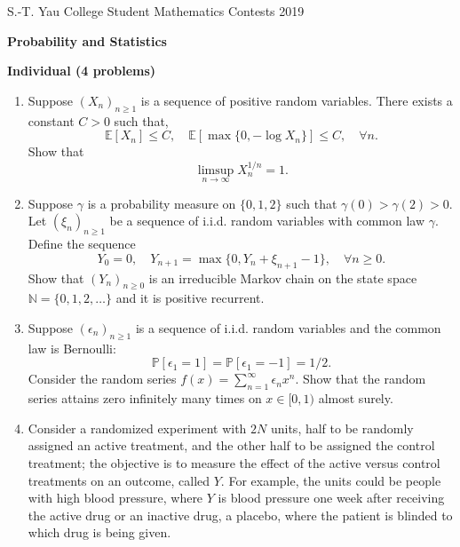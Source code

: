 \documentclass[10pt]{article}
\begin{document}
\begin{center}
S.-T. Yau College Student Mathematics Contests 2019

\vspace{0.1cm}

\Large {\bf Probability and Statistics}

\vspace{0.1cm}

\large {\bf Individual (4 problems)}

\vspace{0.1cm}

\end{center}


\begin{enumerate}

\item[1)]
Suppose $(X_n)_{n\ge 1}$ is a sequence of positive random variables. There exists a constant $C>0$ such that,
\[\mathbb{E}[X_n]\le C, \quad \mathbb{E}[\max\{0, -\log X_n\}]\le C, \quad \forall n. \]
Show that \[\limsup_{n\to\infty}X_n^{1/n}=1.\]

\item[2)]
Suppose $\gamma$ is a probability measure on $\{0,1,2\}$ such that $\gamma(0)>\gamma(2)>0$. Let $(\xi_n)_{n\ge 1}$ be a sequence of i.i.d. random variables with common law $\gamma$. Define the sequence
\[Y_0=0,\quad Y_{n+1}=\max\{0, Y_n+\xi_{n+1}-1\},\quad \forall n\ge 0.\]
Show that $(Y_n)_{n\ge 0}$ is an irreducible Markov chain on the state space $\mathbb{N}=\{0, 1, 2, \ldots\}$ and it is positive recurrent.

\item[3)]
Suppose $(\epsilon_n)_{n\ge 1}$ is a sequence of i.i.d. random variables and the common law is Bernoulli: \[\mathbb{P}[\epsilon_1=1]=\mathbb{P}[\epsilon_1=-1]=1/2.\] Consider the random series
$f(x)=\sum_{n=1}^{\infty}\epsilon_n x^n$.
Show that the random series attains zero infinitely many times on $x\in [0,1)$ almost surely.

\item[4)] Consider a randomized experiment with $2N$ units, half to be randomly assigned an active treatment, and the other half to be assigned the control treatment;  the objective is to measure the effect of the active versus control treatments on an outcome, called $Y$.  For example, the units could be people with high blood pressure, where $Y$ is blood pressure one week after receiving the active drug or an inactive drug, a placebo, where the patient is blinded to which drug is being given.


\end{enumerate}
\end{document}
